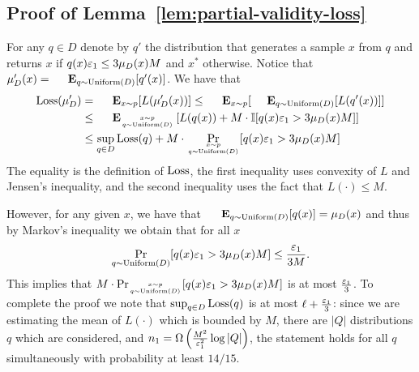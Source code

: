 \subsection{Proof of Lemma~\ref{lem:partial-validity-loss}}
For any $q \in D$ denote by $q'$ the distribution that generates a sample $x$ from $q$ and returns $x$ if $q(x)  {\varepsilon_1} \le 3 \mu_D(x)  {M}$ and $x^*$ otherwise.
Notice that $\mu'_D(x) = \Exp_{q \sim \Unif(D)} [ q'(x) ]$.
We have that
$$\begin{aligned}
\Loss(\mu'_D) &= \Exp_{x \sim p} [ L(\mu'_D(x)) ] \le \Exp_{x \sim p} [ \Exp_{q \sim \Unif(D)} [ L(q'(x)) ] ] \\
&\le \Exp_{x \sim p \atop q \sim \Unif(D)} \left[ L(q(x)) + M \cdot \Ind[q(x)  {\eps_1} > 3 \mu_D(x)  {M}]  \right]\\
&\le \sup_{q \in D} \Loss(q) + M \cdot \Pr_{x \sim p \atop q \sim \Unif(D)}[q(x)  {\eps_1} > 3 \mu_D(x)  {M}]\\
\end{aligned}$$
The equality is the definition of $\text{Loss}$, the first inequality uses convexity of $L$ and Jensen's inequality, and the second inequality uses the fact that $L(\cdot) \leq M$.

However, for any given $x$, we have that $\Exp_{q \sim \Unif(D)}[ q(x) ] =  \mu_D(x)$ and thus by Markov's inequality we obtain that for all $x$ $$\Pr_{q \sim \text{Uniform}(D)}[q(x)  {\varepsilon_1} > 3 \mu_D(x)  {M}] \le \frac {\varepsilon_1} {3 M}.$$
This implies that $M \cdot \Pr_{x \sim p \atop q \sim \text{Uniform}(D)}[q(x)  {\varepsilon_1} > 3 \mu_D(x)  {M}]$ is at most $\frac {\varepsilon_1} {3}$.
To complete the proof we note that $\sup_{q \in D} \text{Loss}(q)$ is at most $\ell + \frac {\varepsilon_1} {3}$: 
since we are estimating the mean of $L(\cdot)$ which is bounded by $M$, there are $|Q|$ distributions $q$ which are considered, and $n_1 = \Omega\left(\frac{M^2}{\varepsilon_1^2}\log |Q|\right)$, the statement holds for all $q$ simultaneously with probability at least $14/15$.
